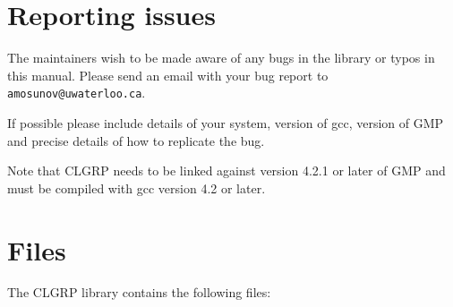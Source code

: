 \documentclass[a4paper,10pt]{article}
\newcommand{\code}{\lstinline}
\begin{document}
\section{Reporting issues}

The maintainers wish to be made aware of any bugs in the library or typos in this manual. Please send an email with your bug report to \code{amosunov@uwaterloo.ca}.

If possible please include details of your system, version of gcc, version of GMP and precise details of how to replicate the bug.

Note that CLGRP needs to be linked against version 4.2.1 or later of GMP and must be compiled with gcc version 4.2 or later.





\section{Files}

The CLGRP library contains the following files:
\end{document}
